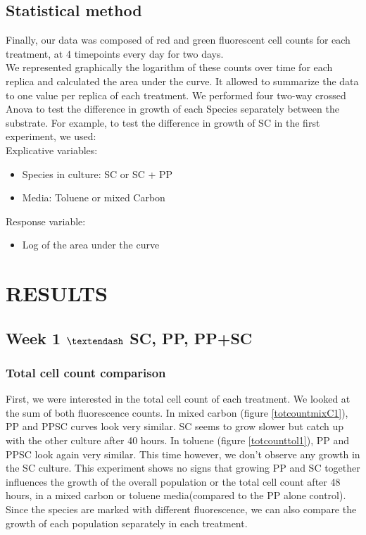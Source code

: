 \documentclass[a4paper, 10pt, conference]{ieeeconf}   %
\begin{document}
\subsection{Statistical method}
Finally, our data was composed of red and green fluorescent cell counts for each treatment, at 4 timepoints every day for two days.\\
We represented graphically the logarithm of these counts over time for each replica and calculated the area under the curve. It allowed to summarize the data to one value per replica of each treatment.
We performed four two-way crossed Anova to test the difference in growth of each Species separately between the substrate. For example, to test the difference in growth of SC in the first experiment, we used: \\
Explicative variables:
\begin{itemize}
	\item Species in culture: SC or SC + PP
	\item Media: Toluene or mixed Carbon
\end{itemize}
Response variable:
\begin{itemize}
	\item Log of the area under the curve
\end{itemize}

\section{RESULTS}
\subsection{Week 1 $\textendash$ SC, PP, PP+SC}
\subsubsection{Total cell count comparison}


First, we were interested in the total cell count of each treatment. We looked at the sum of both fluorescence counts.
In mixed carbon (figure \ref{totcountmixC1}), PP and PPSC curves look very similar. SC seems to grow slower but catch up with the other culture after 40 hours.
In toluene (figure \ref{totcounttol1}), PP and PPSC look again very similar. This time however, 
we don’t observe any growth in the SC culture.
This experiment shows no signs that growing PP and SC together influences the growth of the overall population or the total cell count after 48 hours, in a mixed carbon or toluene media(compared to the PP alone control).
Since the species are marked with different fluorescence, we can also compare the growth of each population separately in each treatment.\newline
\end{document}
